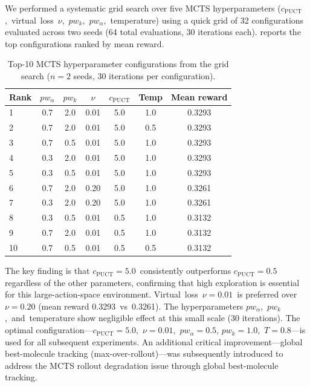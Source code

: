 \documentclass[jcim,article,layout=manuscript]{achemso}
\begin{document}
We performed a systematic grid search over five MCTS hyperparameters
($c_{\text{PUCT}}$,~virtual~loss~$\nu$,~$pw_k$,~$pw_\alpha$,~temperature)
using a quick grid of 32 configurations evaluated across two seeds
(64 total evaluations, 30 iterations each). 
reports the top configurations ranked by mean reward.

\begin{table}[htbp]
  \centering
  \caption{Top-10 MCTS hyperparameter configurations from the grid search
    ($n=2$ seeds, 30 iterations per configuration).}
  \label{tab:hparam_search}
  \begin{tabular}{lcccccc}
    \toprule
    Rank & $pw_\alpha$ & $pw_k$ & $\nu$ & $c_{\text{PUCT}}$ & Temp & Mean reward \\
    \midrule
    1 & 0.7 & 2.0 & 0.01 & 5.0 & 1.0 & 0.3293 \\
    2 & 0.7 & 2.0 & 0.01 & 5.0 & 0.5 & 0.3293 \\
    3 & 0.7 & 0.5 & 0.01 & 5.0 & 1.0 & 0.3293 \\
    4 & 0.3 & 2.0 & 0.01 & 5.0 & 1.0 & 0.3293 \\
    5 & 0.3 & 0.5 & 0.01 & 5.0 & 1.0 & 0.3293 \\
    6 & 0.7 & 2.0 & 0.20 & 5.0 & 1.0 & 0.3261 \\
    7 & 0.3 & 2.0 & 0.20 & 5.0 & 1.0 & 0.3261 \\
    8 & 0.3 & 0.5 & 0.01 & 0.5 & 1.0 & 0.3132 \\
    9 & 0.7 & 2.0 & 0.01 & 0.5 & 1.0 & 0.3132 \\
    10 & 0.7 & 0.5 & 0.01 & 0.5 & 0.5 & 0.3132 \\
    \bottomrule
  \end{tabular}
\end{table}

The key finding is that $c_{\text{PUCT}}=5.0$~consistently outperforms
$c_{\text{PUCT}}=0.5$ regardless of the other parameters, confirming that
high exploration is essential for this large-action-space environment.
Virtual~loss~$\nu=0.01$~is preferred over $\nu=0.20$ (mean reward
0.3293~vs~0.3261). The hyperparameters $pw_\alpha$,~$pw_k$,~and~temperature
show negligible effect at this small scale (30 iterations). The optimal
configuration---$c_{\text{PUCT}}=5.0$,~$\nu=0.01$,~$pw_\alpha=0.5$,
$pw_k=1.0$,~$T=0.8$---is used for all subsequent experiments. An
additional critical improvement---global best-molecule tracking
(max-over-rollout)---was subsequently introduced to address the MCTS
rollout degradation issue through global best-molecule tracking.
\end{document}
